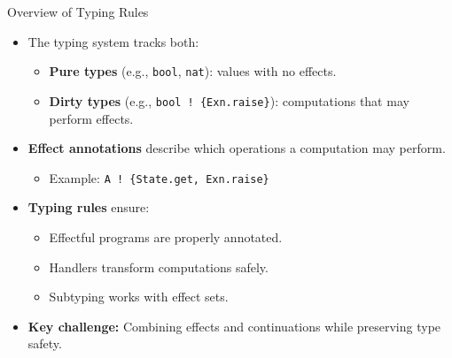 \begin{frame}{Overview of Typing Rules}
\begin{itemize}
  \item The typing system tracks both:
  \begin{itemize}
    \item \textbf{Pure types} (e.g., \texttt{bool}, \texttt{nat}): values with no effects.
    \item \textbf{Dirty types} (e.g., \texttt{bool ! \{Exn.raise\}}): computations that may perform effects.
  \end{itemize}

  \item \textbf{Effect annotations} describe which operations a computation may perform.
  \begin{itemize}
    \item Example: \texttt{A ! \{State.get, Exn.raise\}}
  \end{itemize}

  \item \textbf{Typing rules} ensure:
  \begin{itemize}
    \item Effectful programs are properly annotated.
    \item Handlers transform computations safely.
    \item Subtyping works with effect sets.
  \end{itemize}

  \item \textbf{Key challenge:} Combining effects and continuations while preserving type safety.
\end{itemize}
\end{frame}